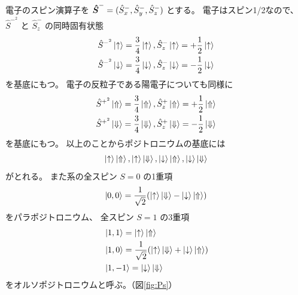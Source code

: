電子のスピン演算子を
$\mbox{\boldmath $\hat{S}$}^{-} = (\hat{S}^{-}_{x},\hat{S}^{-}_{y},\hat{S}^{-}_{z})$
とする。
電子はスピン1/2なので、
$\hat{S}^{-^{2}}$
と
$\hat{S}^{-}_{z}$
の同時固有状態
\begin{equation}
\begin{split}
\hat{S}^{-^{2}} \ket{ \uparrow } = \frac{3}{4} \ket{ \uparrow },
\hat{S}^{-}_{z} \ket{ \uparrow } = + \frac{1}{2} \ket{ \uparrow } \\
\hat{S}^{-^{2}} \ket{ \downarrow } = \frac{3}{4} \ket{ \downarrow },
\hat{S}^{-}_{z} \ket{ \downarrow } = - \frac{1}{2} \ket{ \downarrow }
\end{split}
\label{eq:groundele}
\end{equation}
を基底にもつ。
電子の反粒子である陽電子についても同様に
\begin{equation}
\begin{split}
\hat{S}^{+^{2}} \ket{ \Uparrow } = \frac{3}{4} \ket{ \Uparrow },
\hat{S}^{+}_{z} \ket{ \Uparrow } = + \frac{1}{2} \ket{ \Uparrow } \\
\hat{S}^{+^{2}} \ket{ \Downarrow } = \frac{3}{4} \ket{ \Downarrow },
\hat{S}^{+}_{z} \ket{ \Downarrow } = - \frac{1}{2} \ket{ \Downarrow }
\end{split}
\label{eq:groundeposi}
\end{equation}
を基底にもつ。
以上のことからポジトロニウムの基底には
\begin{equation}
\ket{ \uparrow } \ket{ \Uparrow },\ket{ \uparrow } \ket{ \Downarrow },
\ket{ \downarrow } \ket{ \Uparrow },\ket{ \downarrow } \ket{ \Downarrow }
\end{equation}
がとれる。
また系の全スピン $S = 0$ の1重項
\begin{equation}
\ket{0,0} = \frac{1}{\sqrt{2}} ( \ket{ \uparrow } \ket{ \Downarrow } - \ket{ \downarrow } \ket{ \Uparrow })
\label{eq:para}
\end{equation}
をパラポジトロニウム、
全スピン $S = 1$ の3重項
\begin{equation}
\begin{split}
&\ket{1,1} = \ket{ \uparrow } \ket{ \Uparrow } \\
&\ket{1,0} = \frac{1}{\sqrt{2}} ( \ket{ \uparrow } \ket{ \Downarrow } + \ket{ \downarrow } \ket{ \Uparrow }) \\
&\ket{1,-1} = \ket{ \downarrow } \ket{ \Downarrow }
\end{split}
\label{eq:ortho}
\end{equation}
をオルソポジトロニウムと呼ぶ。（図\ref{fig:Ps}）

